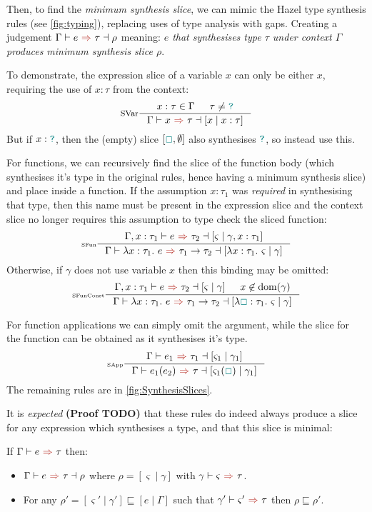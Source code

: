 Then, to find the \textit{minimum synthesis slice}, we can mimic the Hazel type synthesis rules (see \cref{fig:typing}), replacing uses of type analysis with gaps. Creating a judgement $\synthesisslice{e}{\tau}{\rho}$ meaning: \textit{$e$ that synthesises type $\tau$ under context $\Gamma$ produces minimum synthesis slice $\rho$}.

To demonstrate, the expression slice of a variable $x$ can only be either $x$, requiring the use of $x : \tau$ from the context:
\[
\inference[SVar]{x : \tau \in \Gamma & \tau \neq \dyn}{\synthesisslice{x}{\tau}{[x\mid x:\tau]}}\]
But if $x : {\color{teal}\texttt{?}}$, then the (empty) slice $[{\color{teal}\Box}, \emptyset]$ also synthesises ${\color{teal}\texttt{?}}$, so instead use this. 

For functions, we can recursively find the slice of the function body (which synthesises it's type in the original rules, hence having a minimum synthesis slice) and place inside a function. 
If the assumption $x : \tau_1$ was \textit{required} in synthesising that type, then this name must be present in the expression slice and the context slice no longer requires this assumption to type check the sliced function:
\[\inference[\tiny SFun]{\synthesisslice[\Gamma,x:\tau_1]{e}{\tau_2}{[\varsigma \mid \gamma, x : \tau_1]} }{\synthesisslice{\lambda x:\tau_1.\ e}{\tau_1 \to \tau_2}{[\lambda x : \tau_1.\ \varsigma \mid \gamma]}}\]
Otherwise, if $\gamma$ does not use variable $x$ then this binding may be omitted:
\[\inference[\tiny SFunConst]{\synthesisslice[\Gamma,x:\tau_1]{e}{\tau_2}{[\varsigma \mid \gamma]} & x \not \in \mathrm{dom}(\gamma)}{\synthesisslice{\lambda x:\tau_1.\ e}{\tau_1 \to \tau_2}{[\lambda \gap : \tau_1.\ \varsigma \mid \gamma]}}\]

For function applications we can simply omit the argument, while the slice for the function can be obtained as it synthesises it's type.
\[\inference[\tiny SApp]{\synthesisslice{e_1}{\tau_1}{[\varsigma_1 \mid \gamma_1]}}{\synthesisslice{e_1(e_2)}{\tau}{[\varsigma_1(\gap) \mid \gamma_1]}}\]
The remaining rules are in \cref{fig:SynthesisSlices}.

It is \textit{expected} \textbf{(Proof TODO)} that these rules do indeed always produce a slice for any expression which synthesises a type, and that this slice is minimal:
\begin{conjecture}[Correctness]
\label{conj:SynthesisSliceCorrectness}
If $\synthesis{e}{\tau}$ then:
\begin{itemize}
\item $\synthesisslice{e}{\tau}{\rho}$ where $\rho = [\varsigma \mid \gamma]$ with $\synthesis[\gamma]{\varsigma}{\tau}$.
\item For any $\rho' = [\varsigma' \mid \gamma'] \sqsubseteq [e\mid \Gamma]$ such that $\synthesis[\gamma']{\varsigma'}{\tau}$ then $\rho \sqsubseteq \rho'$.
\end{itemize}
\end{conjecture}

